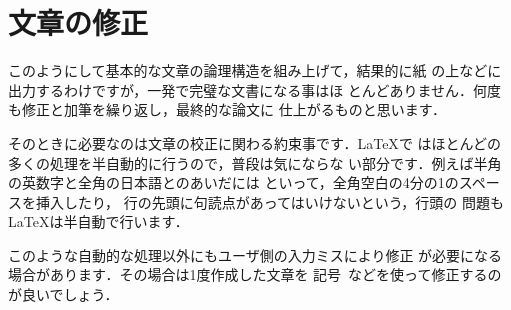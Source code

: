 {\section{文章の修正}
%
%
%
%

このようにして基本的な文章の論理構造を組み上げて，結果的に紙
の上などに出力するわけですが，一発で完璧な文書になる事はほ
とんどありません．何度も修正と加筆を繰り返し，最終的な論文に
仕上がるものと思います．

そのときに必要なのは文章の校正に関わる約束事です．{\LaTeX}で
はほとんどの多くの処理を半自動的に行うので，普段は気にならな
い部分です．例えば半角の英数字と全角の日本語とのあいだには
といって，全角空白の4分の1のスペースを挿入したり，
行の先頭に句読点があってはいけないという，行頭の
問題も{\LaTeX}は半自動で行います．

%
%
このような自動的な処理以外にもユーザ側の入力ミスにより修正
が必要になる場合があります．その場合は1度作成した文章を
記号~\cite{NES1999}などを使って修正するのが良いでしょう．


}
